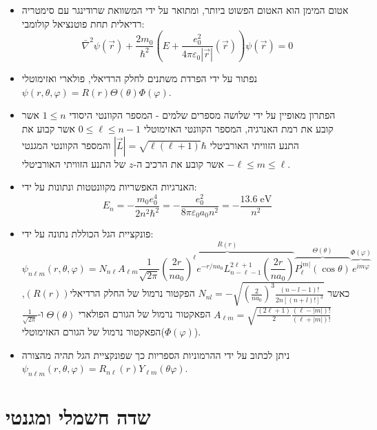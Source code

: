 \documentclass{tstextbook}
\begin{document}
\begin{summary}
  \begin{itemize}
    \item אטום המימן הוא האטום הפשוט ביותר, ומתואר על ידי המשוואת שרודינגר עם סימטריה רדיאלית תחת פוטנציאל קולומבי:
$$ \bar{\nabla}^2 \psi\left(\vec{r}\right)+\frac{2m_{0}}{\hbar^{2}}\left(E+\frac{e_{0}^{2}}{4\pi\varepsilon_{0}\left|\vec{r}\right|}\left(\vec{r}\right)\right) \psi\left(\vec{r}\right)=0 $$
    \item נפתור על ידי הפרדת משתנים לחלק הרדיאלי, פולארי ואזימוטלי \(\psi \left(r,\theta,\varphi\right) =R\left(r\right) \Theta\left(\theta\right) \Phi\left(\varphi\right)\).
    \item הפתרון מאופיין על ידי שלושה מספרים שלמים - המספר הקוונטי היסודי \(1\leq n\) אשר קובע את רמת האנרגיה, המספר הקוונטי האזימוטלי \(0\leq \ell \leq n-1\) אשר קבוע את התנע הזוויתי האורביטלי \(|\vec{L}| = \sqrt{\ell(\ell+1)}\hbar\) והמספר הקוונטי המגנטי \(-\ell \leq m\leq \ell\) אשר קובע את הרכיב ה-\(z\) של התנע הזוויתי האורביטלי.
    \item האנרגיות האפשריות מקוונטטות ונתונות על ידי:
$$ E_{n} = -{\frac{m_{0} e_{0}^{4}}{2n^{2}\hbar^{2}}} = -\frac{e_{0}^{2}}{8\pi\varepsilon_{0}a_{0}n^{2}} = -\frac{13.6 \; \mathrm{eV}}{n^{2}} $$
    \item פונקציית הגל הכוללת נתונה על ידי:
$$ \psi_{n\ell m}\left( r, \theta, \varphi \right) = N_{n\ell} A_{\ell m} \frac{1}{\sqrt{2\pi}}  \overbrace{\left( \frac{2r}{n a_0} \right)^\ell e^{-r/na_0} L_{n-\ell-1}^{2\ell+1} \left( \frac{2r}{n a_0} \right) }^{ R(r) } \overbrace{ P_{\ell}^{|m|} \left( \cos \theta \right) }^{ \Theta\left( \theta \right) } \overbrace{ e^{im\varphi} }^{ \Phi\left( \varphi \right) } $$
כאשר \(N_{n l}=-\sqrt{\left(\frac{2}{n a_{0}}\right)^{3}\frac{(n-l-1)!}{2n[(n+l)!]^{3}}}\) הפקטור נרמול של החלק הרדיאלי\((R(r))\), \(A_{\ell m} = \sqrt{ \frac{(2\ell+1)}{2} \frac{(\ell-|m|)!}{(\ell+|m|)!} }\) הפאקטור נרמול של הגורם הפולארי \(\Theta\left( \theta \right)\) ו-\(\frac{1}{\sqrt{2\pi}}\) הפאקטור נרמול של הגורם האזימוטלי(\(\Phi\left( \varphi \right)\)).
    \item ניתן לכתוב על ידי ההרמוניות הספריות כך שפונקציית הגל תהיה מהצורה \(\psi_{n\ell m}\left( r,\theta,\varphi \right)=R_{n\ell}(r)Y_{\ell m}\left( \theta \varphi \right)\).
  \end{itemize}
\end{summary}
\section{שדה חשמלי ומגנטי}
\end{document}

